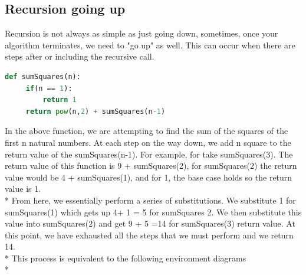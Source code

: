\documentclass{article}
\begin{document}
\subsection{Recursion going up}
Recursion is not always as simple as just going down, sometimes, once your algorithm terminates, we need to "go up" as well. This can occur when there are steps after or including the recursive call. 
\begin{lstlisting}[language = Python]
def sumSquares(n):
     if(n == 1):
         return 1
     return pow(n,2) + sumSquares(n-1)
\end{lstlisting}
In the above function, we are attempting to find the sum of the squares of the first n natural numbers. At each step on the way down, we add n square to the return value of the sumSquares(n-1). For example, for take sumSquares(3). The return value of this function is 9 + sumSquares(2), for sumSquares(2) the return value would be 4 + sumSquares(1), and for 1, the base case holds so the return value is 1. \\*
\bigskip
From here, we essentially perform a series of substitutions. We substitute 1 for sumSquares(1) which gets up 4+ 1 = 5 for sumSquares 2. We then substitute this value into sumSquares(2) and get 9 + 5 =14 for sumSquares(3) return value. At this point, we have exhausted all the steps that we must perform and we return 14. \\*
\bigskip
This process is equivalent to the following environment diagrams  \\*
\end{document}
